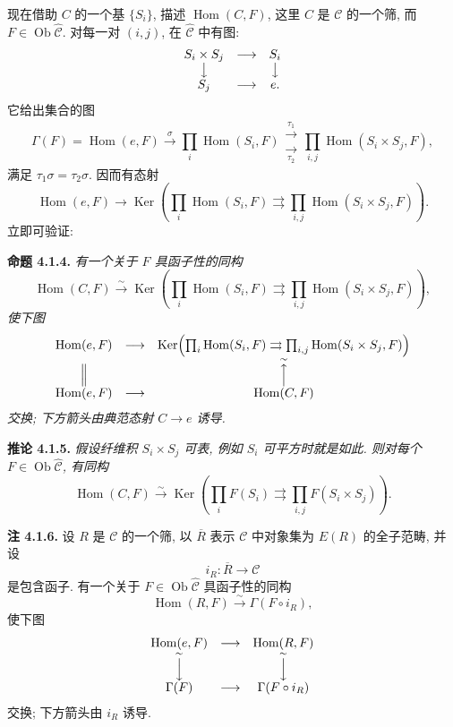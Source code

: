 现在借助 \(C\) 的一个基 \(\{S_i\}\), 描述
\(\operatorname{Hom}(C,F)\), 这里 \(C\) 是 \(\mathscr C\) 的一个筛,
而 \(F\in\operatorname{Ob}\widehat{\mathscr C}\).
对每一对 \((i,j)\), 在 \(\widehat{\mathscr C}\) 中有图:
\[
\begin{array}{ccc}
 S_i\times S_j&\longrightarrow&S_i\\
 \big\downarrow&&\big\downarrow\\
 S_j&\longrightarrow&e.
\end{array}
\]
它给出集合的图
\[
 \Gamma(F)=\operatorname{Hom}(e,F)
 \xrightarrow{\sigma}
 \prod_i\operatorname{Hom}(S_i,F)
 \mathrel{\substack{\xrightarrow{\tau_1}\\[-0.5ex]
                     \xrightarrow[\tau_2]{}}}
 \prod_{i,j}\operatorname{Hom}(S_i\times S_j,F),
\]
满足 \(\tau_1\sigma=\tau_2\sigma\). 因而有态射
\[
 \operatorname{Hom}(e,F)\longrightarrow
 \operatorname{Ker}\!\left(
 \prod_i\operatorname{Hom}(S_i,F)
 \rightrightarrows
 \prod_{i,j}\operatorname{Hom}(S_i\times S_j,F)
 \right).
\]
立即可验证:

\medskip
\noindent{}\textbf{命题 4.1.4.}
\textit{有一个关于 \(F\) 具函子性的同构}
\[
 \operatorname{Hom}(C,F)\xrightarrow{\sim}
 \operatorname{Ker}\!\left(
 \prod_i\operatorname{Hom}(S_i,F)
 \rightrightarrows
 \prod_{i,j}\operatorname{Hom}(S_i\times S_j,F)
 \right),
\]
\textit{使下图}
\[
\begin{array}{ccc}
 \operatorname{Hom}(e,F)&\longrightarrow&
 \operatorname{Ker}\!\left(
 \prod_i\operatorname{Hom}(S_i,F)\rightrightarrows
 \prod_{i,j}\operatorname{Hom}(S_i\times S_j,F)\right)\\
 \Big\Vert&&\overset{\sim}{\Big\uparrow}\\
 \operatorname{Hom}(e,F)&\longrightarrow&\operatorname{Hom}(C,F)
\end{array}
\]
\textit{交换; 下方箭头由典范态射 \(C\to e\) 诱导.}

\medskip
\noindent{}\textbf{推论 4.1.5.}
\textit{假设纤维积 \(S_i\times S_j\) 可表,
例如 \(S_i\) 可平方时就是如此.
则对每个 \(F\in\operatorname{Ob}\widehat{\mathscr C}\), 有同构}
\[
 \operatorname{Hom}(C,F)\xrightarrow{\sim}
 \operatorname{Ker}\!\left(
 \prod_iF(S_i)\rightrightarrows
 \prod_{i,j}F(S_i\times S_j)\right).
\]

\medskip
\noindent{}\textbf{注 4.1.6.}
设 \(R\) 是 \(\mathscr C\) 的一个筛,
以 \(\overline R\) 表示 \(\mathscr C\) 中对象集为 \(E(R)\) 的全子范畴,
并设
\[
 i_R:\overline R\longrightarrow\mathscr C
\]
是包含函子. 有一个关于 \(F\in\operatorname{Ob}\widehat{\mathscr C}\)
具函子性的同构
\[
 \operatorname{Hom}(R,F)\xrightarrow{\sim}\Gamma(F\circ i_R),
\]
使下图
\[
\begin{array}{ccc}
 \operatorname{Hom}(e,F)&\longrightarrow&\operatorname{Hom}(R,F)\\
 \overset{\sim}{\Big\downarrow}&&
 \overset{\sim}{\Big\downarrow}\\
 \Gamma(F)&\longrightarrow&\Gamma(F\circ i_R)
\end{array}
\]
交换; 下方箭头由 \(i_R\) 诱导.

